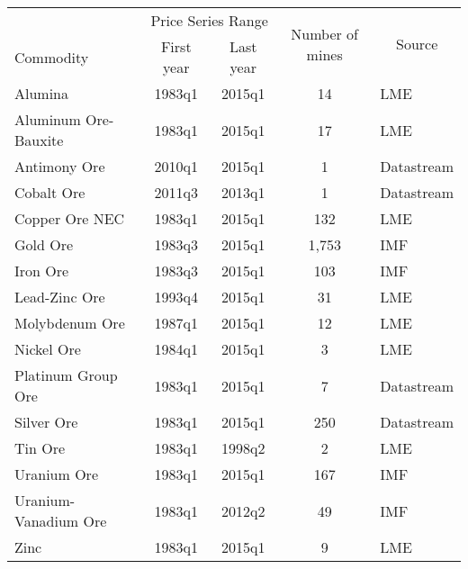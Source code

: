 \begin{tabular}{lcccl}
\hline
      & \multicolumn{2}{c}{Price Series Range} & \multicolumn{1}{c}{\multirow{2}[4]{*}{Number of mines}} & \multicolumn{1}{c}{\multirow{2}[4]{*}{Source}} \bigstrut\\
\cline{2-3}\multicolumn{1}{p{10.645em}}{Commodity} & \multicolumn{1}{p{5.5em}}{First year} & \multicolumn{1}{p{5.5em}}{Last year} &       &  \bigstrut\\
\hline
Alumina & 1983q1 & 2015q1 & 14    & LME \bigstrut[t]\\
Aluminum Ore-Bauxite & 1983q1 & 2015q1 & 17    & LME \\
Antimony Ore & 2010q1 & 2015q1 & 1     & Datastream \\
Cobalt Ore & 2011q3 & 2013q1 & 1     & Datastream \\
Copper Ore NEC & 1983q1 & 2015q1 & 132   & LME \\
Gold Ore & 1983q3 & 2015q1 & 1,753  & IMF \\
Iron Ore & 1983q3 & 2015q1 & 103   & IMF \\
Lead-Zinc Ore & 1993q4 & 2015q1 & 31    & LME \\
Molybdenum Ore & 1987q1 & 2015q1 & 12    & LME \\
Nickel Ore & 1984q1 & 2015q1 & 3     & LME \\
Platinum Group Ore & 1983q1 & 2015q1 & 7     & Datastream \\
Silver Ore & 1983q1 & 2015q1 & 250   & Datastream \\
Tin Ore & 1983q1 & 1998q2 & 2     & LME \\
Uranium Ore & 1983q1 & 2015q1 & 167   & IMF \\
Uranium-Vanadium Ore & 1983q1 & 2012q2 & 49    & IMF \\
Zinc  & 1983q1 & 2015q1 & 9     & LME \bigstrut[b]\\
\hline
\end{tabular}%